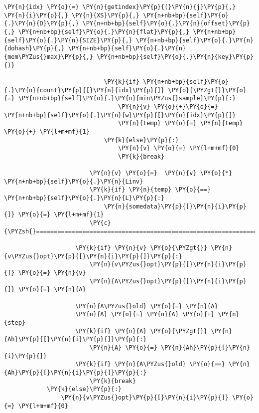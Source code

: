 \begin{Verbatim}[commandchars=\\\{\}]
                            \PY{n}{idx} \PY{o}{=} \PY{n}{getindex}\PY{p}{(}\PY{n}{j}\PY{p}{,} \PY{n}{i}\PY{p}{,} \PY{n}{XS}\PY{p}{,} \PY{n+nb+bp}{self}\PY{o}{.}\PY{n}{D}\PY{p}{,} \PY{n+nb+bp}{self}\PY{o}{.}\PY{n}{offset}\PY{p}{,} \PY{n+nb+bp}{self}\PY{o}{.}\PY{n}{flat}\PY{p}{,} \PY{n+nb+bp}{self}\PY{o}{.}\PY{n}{SIZE}\PY{p}{,} \PY{n+nb+bp}{self}\PY{o}{.}\PY{n}{dohash}\PY{p}{,} \PY{n+nb+bp}{self}\PY{o}{.}\PY{n}{mem\PYZus{}max}\PY{p}{,} \PY{n+nb+bp}{self}\PY{o}{.}\PY{n}{key}\PY{p}{)}
                           
                            \PY{k}{if} \PY{n+nb+bp}{self}\PY{o}{.}\PY{n}{count}\PY{p}{[}\PY{n}{idx}\PY{p}{]} \PY{o}{\PYZgt{}}\PY{o}{=} \PY{n+nb+bp}{self}\PY{o}{.}\PY{n}{min\PYZus{}sample}\PY{p}{:}
                                \PY{n}{v} \PY{o}{+}\PY{o}{=} \PY{n+nb+bp}{self}\PY{o}{.}\PY{n}{w}\PY{p}{[}\PY{n}{idx}\PY{p}{]}
                                \PY{n}{temp} \PY{o}{=} \PY{n}{temp} \PY{o}{+} \PY{l+m+mf}{1}
                            \PY{k}{else}\PY{p}{:}
                                \PY{n}{v} \PY{o}{=} \PY{l+m+mf}{0}
                                \PY{k}{break}
                        
                        \PY{n}{v} \PY{o}{=}  \PY{n}{v} \PY{o}{*} \PY{n+nb+bp}{self}\PY{o}{.}\PY{n}{Linv}
                        \PY{k}{if} \PY{n}{temp} \PY{o}{==} \PY{n+nb+bp}{self}\PY{o}{.}\PY{n}{L}\PY{p}{:}
                            \PY{n}{somedata}\PY{p}{[}\PY{n}{i}\PY{p}{]} \PY{o}{=} \PY{l+m+mf}{1}
                        \PY{c}{\PYZsh{}========================================================================}
                    
                    \PY{k}{if} \PY{n}{v} \PY{o}{\PYZgt{}} \PY{n}{v\PYZus{}opt}\PY{p}{[}\PY{n}{i}\PY{p}{]}\PY{p}{:}
                        \PY{n}{v\PYZus{}opt}\PY{p}{[}\PY{n}{i}\PY{p}{]} \PY{o}{=} \PY{n}{v}
                        \PY{n}{A\PYZus{}opt}\PY{p}{[}\PY{n}{i}\PY{p}{]} \PY{o}{=} \PY{n}{A}
                    
                    \PY{n}{A\PYZus{}old} \PY{o}{=} \PY{n}{A}
                    \PY{n}{A} \PY{o}{=} \PY{n}{A} \PY{o}{+} \PY{n}{step}
                    \PY{k}{if} \PY{n}{A} \PY{o}{\PYZgt{}} \PY{n}{Ah}\PY{p}{[}\PY{n}{i}\PY{p}{]}\PY{p}{:}
                        \PY{n}{A} \PY{o}{=} \PY{n}{Ah}\PY{p}{[}\PY{n}{i}\PY{p}{]}
                    \PY{k}{if} \PY{n}{A\PYZus{}old} \PY{o}{==} \PY{n}{Ah}\PY{p}{[}\PY{n}{i}\PY{p}{]}\PY{p}{:}
                        \PY{k}{break}
            \PY{k}{else}\PY{p}{:}
                \PY{n}{v\PYZus{}opt}\PY{p}{[}\PY{n}{i}\PY{p}{]} \PY{o}{=} \PY{l+m+mf}{0}
       

\end{Verbatim}
